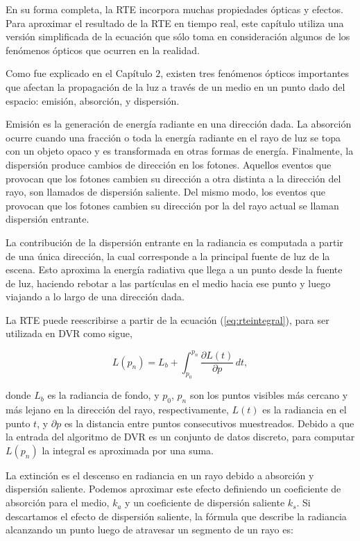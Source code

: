 En su forma completa, la RTE incorpora muchas propiedades ópticas y efectos.
Para aproximar el resultado de la RTE en tiempo real, este capítulo utiliza una versión simplificada de la ecuación que sólo toma en consideración algunos de los fenómenos ópticos que ocurren en la realidad.

Como fue explicado en el Capítulo $2$, existen tres fenómenos ópticos importantes que afectan la propagación de la luz a través de un medio en un punto dado del espacio: emisión, absorción, y dispersión.

Emisión es la generación de energía radiante en una dirección dada.
La absorción ocurre cuando una fracción o toda la energía radiante en el rayo de luz se topa con un objeto opaco y es transformada en otras formas de energía.
Finalmente, la dispersión produce cambios de dirección en los fotones.
Aquellos eventos que provocan que los fotones cambien su dirección a otra distinta a la dirección del rayo, son llamados de dispersión saliente. Del mismo modo, los eventos que provocan que los fotones cambien su dirección por la del rayo actual se llaman dispersión entrante.

%
La contribución de la dispersión entrante en la radiancia es computada a partir de una única dirección, la cual corresponde a la principal fuente de luz de la escena.
Esto aproxima la energía radiativa que llega a un punto desde la fuente de luz, haciendo rebotar a las partículas en el medio hacia ese punto y luego viajando a lo largo de una dirección dada. 

La RTE puede reescribirse a partir de la ecuación (\ref{eq:rteintegral}), para ser utilizada en DVR como sigue,

\begin{equation} \label{eq:general_radiance}  
  L(p_n) = L_b + \int_{p_0}^{p_n} \frac{\partial L(t)}{\partial p} \, dt,
\end{equation}

\noindent donde $L_b$ es la radiancia de fondo, y $p_0$, $p_n$ son los puntos visibles más cercano y más lejano en la dirección del rayo, respectivamente, $L(t)$  es la radiancia en el punto $t$, y $\partial p$ es la distancia entre puntos consecutivos muestreados. 
Debido a que la entrada del algoritmo de DVR es un conjunto de datos discreto, para computar $L(p_n)$ la integral es aproximada por una suma.

La extinción es el descenso en radiancia en un rayo debido a absorción y dispersión saliente.
Podemos aproximar este efecto definiendo un coeficiente de absorción para el medio, $k_a$ y un coeficiente de dispersión saliente $k_s$. 
Si descartamos el efecto de dispersión saliente, la fórmula que describe la radiancia alcanzando un punto luego de atravesar un segmento de un rayo es:

